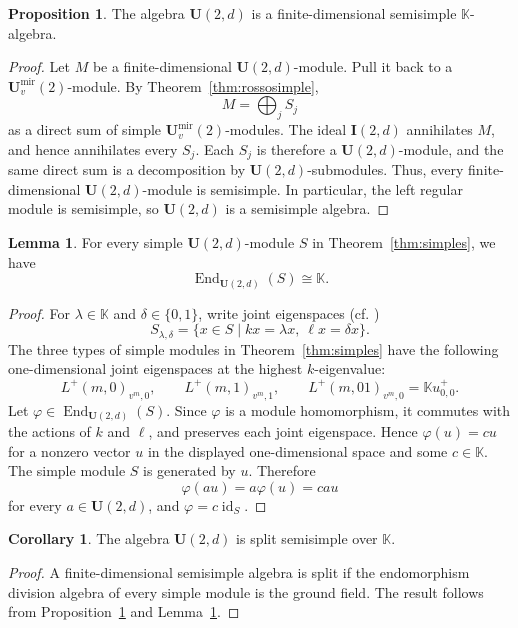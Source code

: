 \documentclass[12pt]{amsart}
\numberwithin{equation}{section}
\theoremstyle{definition}
\newtheorem{proposition}[theorem]{Proposition}
\newtheorem{lemma}[theorem]{Lemma}
\newtheorem{corollary}[theorem]{Corollary}
\theoremstyle{definition}
\newcommand{\kk}{\mathbb K}
\newcommand{\Umir}{\mathbf U^{\mathrm{mir}}_v(2)}
\newcommand{\Ufd}{\mathbf U(2,d)}
\newcommand{\End}{\operatorname{End}}
\newcommand{\Ifd}{\mathbf{I}(2,d)}
\begin{document}
\begin{proposition}\label{prop:semisimple}
The algebra $\Ufd$ is a finite-dimensional semisimple $\kk$-algebra.
\end{proposition}

\begin{proof}
Let $M$ be a finite-dimensional $\Ufd$-module. Pull it back to a $\Umir$-module. By Theorem~\ref{thm:rossosimple},
$$
M=\bigoplus_j S_j
$$
as a direct sum of simple $\Umir$-modules. The ideal $\Ifd$ annihilates $M$, and hence annihilates every $S_j$. Each $S_j$ is therefore a $\Ufd$-module, and the same direct sum is a decomposition by $\Ufd$-submodules. Thus, every finite-dimensional $\Ufd$-module is semisimple. In particular, the left regular module is semisimple, so $\Ufd$ is a semisimple algebra.
\end{proof}

\begin{lemma}\label{lem:end}
For every simple $\Ufd$-module $S$ in Theorem~\ref{thm:simples}, we have
$$
\End_{\Ufd}(S) \cong \kk.
$$
\end{lemma}
\begin{proof}
For $\lambda\in\kk$ and $\delta\in\{0,1\}$, write joint eigenspaces (cf. \cite[Definition 5.1]{Ros18})
$$
S_{\lambda,\delta}
=\{x\in S\mid kx=\lambda x,\ \ell x=\delta x\}.
$$
The three types of simple modules in Theorem~\ref{thm:simples} have the following one-dimensional joint eigenspaces at the highest $k$-eigenvalue:
$$
L^+(m,0)_{v^m,0},
\qquad
L^+(m,1)_{v^m,1},
\qquad
L^+(m,01)_{v^m,0}=\kk u^+_{0,0}.
$$
Let $\varphi\in\End_{\Ufd}(S)$. Since $\varphi$ is a module homomorphism, it commutes with the actions of $k$ and $\ell$, and preserves each joint eigenspace. Hence $\varphi(u)=cu$ for a nonzero vector $u$ in the displayed one-dimensional space and some $c\in\kk$. The simple module $S$ is generated by $u$. Therefore
$$
\varphi(au)=a\varphi(u)=cau
$$
for every $a\in\Ufd$, and $\varphi=c\operatorname{id}_S$.
\end{proof}

\begin{corollary}\label{cor:split}
The algebra $\Ufd$ is split semisimple over $\kk$.
\end{corollary}

\begin{proof}
A finite-dimensional semisimple algebra is split if the endomorphism division algebra of every simple module is the ground field. The result follows from Proposition~\ref{prop:semisimple} and Lemma~\ref{lem:end}.
\end{proof}
\end{document}

